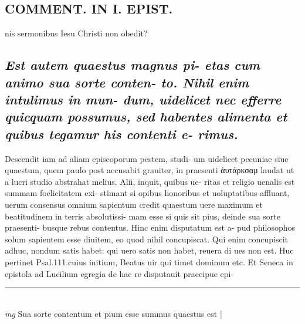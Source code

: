 \documentclass{article}
\begin{document}
\begin{pages}
\section*{COMMENT. IN I. EPIST. }\pstart nis sermonibus Iesu Christi non obedit?  \pend
{}
{}
\subsection*{\textit{Est autem quaestus magnus pi- etas cum animo sua sorte conten- to. Nihil enim intulimus in mun- dum, uidelicet nec efferre quicquam possumus, sed habentes alimenta et quibus tegamur his contenti e- rimus. }}\pstart Descendit iam ad aliam episcoporum pestem, studi- um uidelicet pecuniae siue quaestum, quem paulo post accusabit grauiter, in praesenti ἀυτάρκσαμ laudat ut a lucri studio abstrahat melius. Alii, inquit, quibus ue- ritas et religio uenalis est summam foelicitatem exi- stimant si opibus honoribus et uoluptatibus affluant, uerum consensus omnium sapientum credit quaestum uere maximum et beatitudinem in terris absolutissi- mam esse si quis sit pius, deinde sua sorte praesenti- busque rebus contentus. Hinc enim disputatum est a- pud philosophos solum sapientem esse diuitem, eo quod nihil concupiscat. Qui enim concupiscit adhuc, nondum satis habet: qui uero satis non habet, reuera di ues non est. Huc pertinet Psal.111.cuius initium, Beatus uir qui timet dominum etc. Et Seneca in epistola ad Lucilium egregia de hac re disputauit praecipue epi-  \pend
\vspace{0.5cm}\noindent
\vspace{0.2cm}\rule{1cm}{0.2pt}\\ 
\hspace{0.2cm}\textit{mg}
\footnotesize Sua sorte contentum et pium esse summus quaestus est 
\normalsize| 

\end{pages}
\end{document}

